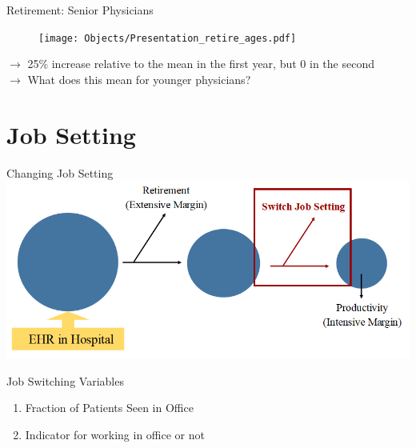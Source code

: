 \documentclass[10pt]{beamer}
\begin{document}
\begin{frame}{Retirement: Senior Physicians}
\begin{figure}[ht]
    \centering
    \texttt{[image: Objects/Presentation\_retire\_ages.pdf]}
\end{figure}
$\rightarrow$ 25\% increase relative to the mean in the first year, but 0 in the second\\
$\rightarrow$ What does this mean for younger physicians?
\end{frame}





\section{Job Setting}




\begin{frame}{Changing Job Setting}
    \centering
    \includegraphics[scale=.5]{Objects/EHR_FlowChart_JobSwitch.PNG}
\end{frame}

\begin{frame}{Job Switching Variables}
    \begin{enumerate}
        \item Fraction of Patients Seen in Office 
        \vspace{3mm}
        \item Indicator for working in office or not
    \end{enumerate}
\end{frame}
\end{document}
